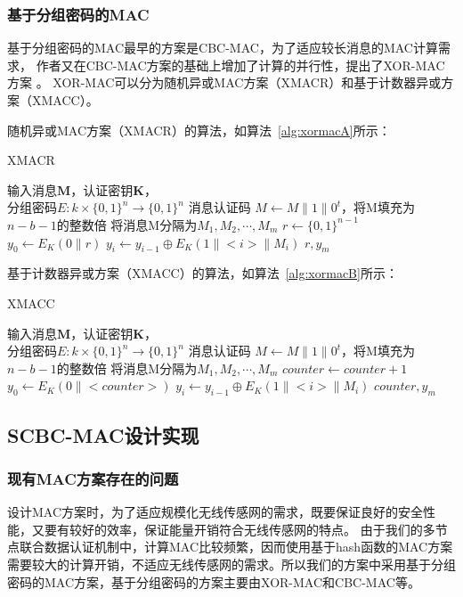 \subsubsection{基于分组密码的MAC}
基于分组密码的MAC最早的方案是CBC-MAC，为了适应较长消息的MAC计算需求，
作者又在CBC-MAC方案的基础上增加了计算的并行性，提出了XOR-MAC方案
。
XOR-MAC可以分为随机异或MAC方案（XMACR）和基于计数器异或方案（XMACC）。

随机异或MAC方案（XMACR）的算法，如算法~\ref{alg:xormacA}所示：
\begin{algorithm}[htbp]
  \caption{XMACR}
  \label{alg:xormacA}
  \begin{algorithmic}[1]
    \REQUIRE 输入消息$\mathbf{M}$，认证密钥$\mathbf{K}$，\\
            分组密码$E:k\times \{0,1\}^n \rightarrow \{0,1\}^n$
    \ENSURE 消息认证码
    \STATE $M \leftarrow M\| 1\|0^t$，将M填充为$n-b-1$的整数倍
        \STATE 将消息M分隔为$M_1,M_2,\cdots,M_m$
    \ENDIF
    \STATE $r \leftarrow \{0,1\}^{n-1}$
    \STATE $y_0\leftarrow E_K(0\|r)$
        \STATE $y_i \leftarrow y_{i-1}\oplus E_K(1\|<i>\|M_i)$
    \ENDFOR
    \RETURN $r,y_m$
  \end{algorithmic}
\end{algorithm}

基于计数器异或方案（XMACC）的算法，如算法~\ref{alg:xormacB}所示：
\begin{algorithm}[htbp]
  \caption{XMACC}
  \label{alg:xormacB}
  \begin{algorithmic}[1]
    \REQUIRE 输入消息$\mathbf{M}$，认证密钥$\mathbf{K}$，\\
            分组密码$E:k\times \{0,1\}^n \rightarrow \{0,1\}^n$
    \ENSURE 消息认证码
    \STATE $M \leftarrow M\| 1\|0^t$，将M填充为$n-b-1$的整数倍
        \STATE 将消息M分隔为$M_1,M_2,\cdots,M_m$
    \ENDIF
    \STATE $counter \leftarrow counter+1$
    \STATE $y_0\leftarrow E_K(0\|<counter>)$
        \STATE $y_i \leftarrow y_{i-1}\oplus E_K(1\|<i>\|M_i)$
    \ENDFOR
    \RETURN $counter,y_m$
  \end{algorithmic}
\end{algorithm}

\subsection{SCBC-MAC设计实现}
\subsubsection{现有MAC方案存在的问题}
设计MAC方案时，为了适应规模化无线传感网的需求，既要保证良好的安全性能，又要有较好的效率，保证能量开销符合无线传感网的特点。
由于我们的多节点联合数据认证机制中，计算MAC比较频繁，因而使用基于hash函数的MAC方案需要较大的计算开销，不适应无线传感网的需求。所以我们的方案中采用基于分组密码的MAC方案，基于分组密码的方案主要由XOR-MAC和CBC-MAC等。

